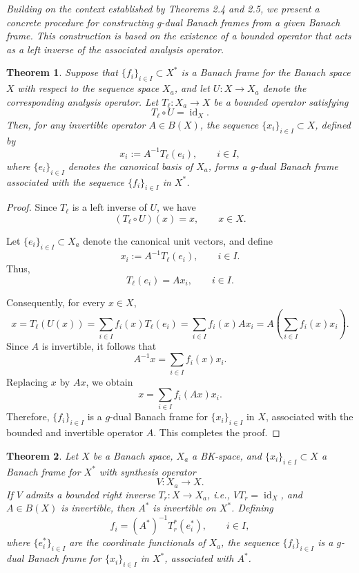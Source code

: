 \documentclass[12pt]{article}
\newtheorem{theorem}{Theorem}[section]
\theoremstyle{definition}
\theoremstyle{remark}
\begin{document}
\textit{Building on the context established by Theorems 2.4 and 2.5, we present a concrete procedure for constructing g-dual Banach frames from a given Banach frame. This construction is based on the existence of a bounded operator that acts as a left inverse of the associated analysis operator.}
\begin{theorem}
Suppose that \( \{f_i\}_{i \in I} \subset X^* \) is a Banach frame for the Banach space \( X \) with respect to the sequence space \( X_a \), and let \( U : X \rightarrow X_a \) denote the corresponding analysis operator. Let \( T_\ell : X_a \rightarrow X \) be a bounded operator satisfying
\[
T_\ell \circ U = \operatorname{id}_X.
\]
Then, for any invertible operator \( A \in B(X) \), the sequence \( \{x_i\}_{i \in I} \subset X \), defined by
\[
x_i := A^{-1} T_\ell(e_i), \qquad i \in I,
\]
where \( \{e_i\}_{i \in I} \) denotes the canonical basis of \( X_a \), forms a g-dual Banach frame associated with the sequence \( \{f_i\}_{i \in I} \) in \( X^* \).
\end{theorem}

\begin{proof}
Since \(T_\ell\) is a left inverse of \(U\), we have
\[
(T_\ell\circ U)(x)=x,
\qquad x\in X.
\]

Let \(\{e_i\}_{i\in I}\subset X_a\) denote the canonical unit vectors, and
define
\[
x_i:=A^{-1}T_\ell(e_i),
\qquad i\in I.
\]
Thus,
\[
T_\ell(e_i)=Ax_i,
\qquad i\in I.
\]

Consequently, for every \(x\in X\),
\[
x
=
T_\ell(U(x))
=
\sum_{i\in I}f_i(x)T_\ell(e_i)
=
\sum_{i\in I}f_i(x)Ax_i
=
A\left(\sum_{i\in I}f_i(x)x_i\right).
\]
Since \(A\) is invertible, it follows that
\[
A^{-1}x
=
\sum_{i\in I}f_i(x)x_i.
\]
Replacing \(x\) by \(Ax\), we obtain
\[
x
=
\sum_{i\in I}f_i(Ax)x_i.
\]
Therefore, \(\{f_i\}_{i\in I}\) is a \(g\)-dual Banach frame for
\(\{x_i\}_{i\in I}\) in \(X\), associated with the bounded and invertible
operator \(A\). This completes the proof.

\end{proof}

\begin{theorem}
	Let \(X\) be a Banach space, \(X_a\) a BK-space, and
	\(\{x_i\}_{i\in I}\subset X\) a Banach frame for \(X^*\) with synthesis
	operator
	\[
	V:X_a\to X.
	\]
	If \(V\) admits a bounded right inverse \(T_r:X\to X_a\), i.e.,
	\(VT_r=\operatorname{id}_X\), and \(A\in B(X)\) is invertible,
	then \(A^*\) is invertible on \(X^*\). Defining
	\[
	f_i=(A^*)^{-1}T_r^*(e_i^*),\qquad i\in I,
	\]
	where \(\{e_i^*\}_{i\in I}\) are the coordinate functionals of \(X_a\),
	the sequence \(\{f_i\}_{i\in I}\) is a \(g\)-dual Banach frame for
	\(\{x_i\}_{i\in I}\) in \(X^*\), associated with \(A^*\).
\end{theorem}
\end{document}
